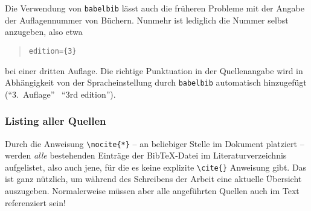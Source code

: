 Die Verwendung von \verb!babelbib! lässt auch die früheren Probleme mit der
Angabe der Auflagennummer von Büchern. Nunmehr ist lediglich die Nummer selbst anzugeben, also etwa
\begin{quote}
\verb!edition={3}!
\end{quote}
bei einer dritten Auflage. Die richtige Punktuation in der Quellenangabe wird in Abhängigkeit von der Spracheinstellung durch \texttt{babelbib} automatisch hinzugefügt ("`3.\ Auflage"' \bzw\ "`3rd edition"').


\subsubsection{Listing aller Quellen}

Durch die Anweisung \verb!\nocite{*}! -- an beliebiger Stelle im Dokument platziert -- werden \emph{alle} bestehenden Einträge der BibTeX-Datei im Literaturverzeichnis aufgelistet, also auch jene, für die es keine explizite \verb!\cite{}! Anweisung gibt. Das ist ganz nützlich, um während des Schreibens der Arbeit eine aktuelle Übersicht auszugeben. Normalerweise müssen aber alle angeführten Quellen auch im Text referenziert sein!
